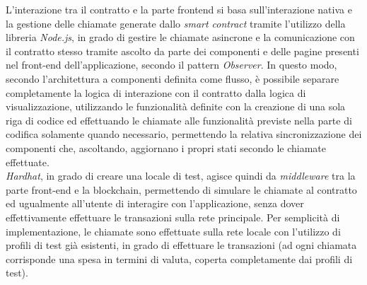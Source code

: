 L'interazione tra il contratto e la parte frontend si basa sull'interazione nativa e la gestione delle chiamate generate dallo \textit{smart contract} tramite l'utilizzo
della libreria \textit{Node.js}, in grado di gestire le chiamate asincrone e la comunicazione con il contratto stesso tramite ascolto da parte dei componenti e delle pagine
presenti nel front-end dell'applicazione, secondo il pattern \textit{Observer}. 
In questo modo, secondo l'architettura a componenti definita come flusso, è possibile separare completamente la logica di interazione con il contratto dalla logica di visualizzazione,
utilizzando le funzionalità definite con la creazione di una sola riga di codice ed effettuando le chiamate alle funzionalità previste nella parte di codifica 
solamente quando necessario, permettendo la relativa sincronizzazione dei componenti che, ascoltando, aggiornano i propri stati secondo le chiamate effettuate. \\

\textit{Hardhat}, in grado di creare una locale di test, agisce quindi da \textit{middleware} tra la parte front-end e la blockchain, permettendo di simulare le chiamate al contratto
ed ugualmente all'utente di interagire con l'applicazione, senza dover effettivamente effettuare le transazioni sulla rete principale.
Per semplicità di implementazione, le chiamate sono effettuate sulla rete locale con l'utilizzo di profili di test già esistenti, in grado di effettuare le transazioni (ad ogni chiamata
corrisponde una spesa in termini di valuta, coperta completamente dai profili di test). \\

